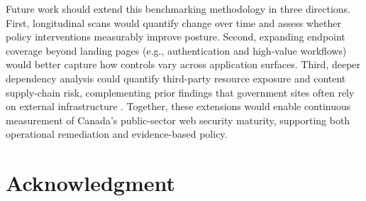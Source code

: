 \documentclass[conference]{IEEEtran}
\begin{document}
Future work should extend this benchmarking methodology in three directions. First, longitudinal scans would
quantify change over time and assess whether policy interventions measurably improve posture. 
Second, expanding endpoint coverage beyond landing pages (e.g., authentication and high-value workflows) would better capture how
controls vary across application surfaces. Third, deeper dependency analysis could quantify third-party resource
exposure and content supply-chain risk, complementing prior findings that government sites often rely on external
infrastructure \cite{hsiao2019cyberautonomy}. Together, these extensions would enable continuous measurement of
Canada’s public-sector web security maturity, supporting both operational remediation and evidence-based policy.

\section*{Acknowledgment}








\end{document}

